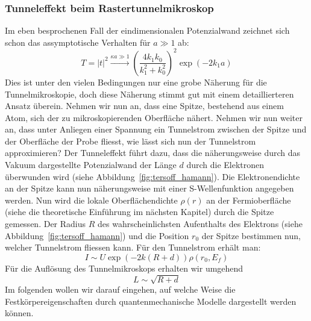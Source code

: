 \subsubsection{Tunneleffekt beim Rastertunnelmikroskop}
Im eben besprochenen Fall der eindimensionalen Potenzialwand zeichnet sich schon das
assymptotische Verhalten für $a\gg1$ ab:
\begin{equation}
    T = \left | t \right |^2 \overset{\kappa a \gg 1}{\rightarrow} (\frac{4k_1k_0}{k_1^2+k_0^2})^2 
    \exp(-2k_1a)
\end{equation}
Dies ist unter den vielen Bedingungen nur eine grobe Näherung für die Tunnelmikroskopie, doch
diese Näherung stimmt gut mit einem detaillierteren Ansatz überein.
Nehmen wir nun an, dass eine Spitze, bestehend aus einem Atom, sich der zu mikroskopierenden
Oberfläche nähert. Nehmen wir nun weiter an, dass unter Anliegen einer Spannung ein Tunnelstrom
zwischen der Spitze und der Oberfläche der Probe fliesst, wie lässt sich nun der Tunnelstrom
approximieren? Der Tunneleffekt führt dazu, dass die näherungsweise durch das Vakuum 
dargestellte Potenzialwand der Länge $d$ durch die Elektronen überwunden wird (siehe
Abbildung~\ref{fig:tersoff_hamann}). Die Elektronendichte an der Spitze kann nun näherungsweise
mit einer S-Wellenfunktion angegeben werden\cite{staatsexamen}. 
Nun wird die lokale Oberflächendichte $\rho(r)$ an
der Fermioberfläche (siehe die theoretische Einführung
im nächsten Kapitel) durch die Spitze gemessen. Der Radius $R$ des wahrscheinlichsten Aufenthalts
des Elektrons (siehe Abbildung~\ref{fig:tersoff_hamann}) und die Position $r_0$ der Spitze 
bestimmen nun, welcher Tunnelstrom fliessen kann.
Für den Tunnelstrom erhält man:
\begin{equation}
    I \sim U \exp(-2k(R+d)) \rho(r_0,E_f)
\end{equation}
Für die Auflösung des Tunnelmikroskops erhalten wir umgehend
\begin{equation}
    L \sim \sqrt{R+d} 
\end{equation}
Im folgenden wollen wir darauf eingehen, auf welche Weise die Festkörpereigenschaften
durch quantenmechanische Modelle dargestellt werden können. 
